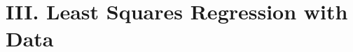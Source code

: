 \documentclass[12pt]{article}
\begin{document}
\begin{enumerate}[label=\textbf{\arabic*.}]
	
\end{enumerate}


\section*{III. Least Squares Regression with Data}
\end{document}
